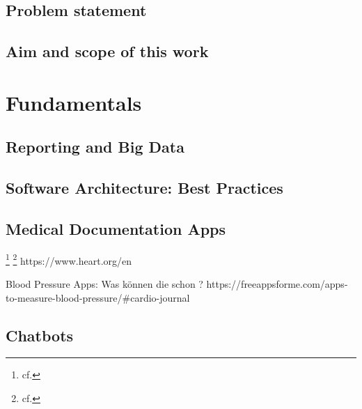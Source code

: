 \section{Problem statement}

\section{Aim and scope of this work}

\chapter{Fundamentals}\label{fundamentals}

\section{Reporting and Big Data}
\section{Software Architecture: Best Practices}
\section{Medical Documentation Apps}

\footnote{cf.\autocite{lupton_mhealth}}
\footnote{cf.\autocite{lupton_apps}}
https://www.heart.org/en

Blood Pressure Apps:
Was können die schon ? 
https://freeappsforme.com/apps-to-measure-blood-pressure/#cardio-journal
\section{Chatbots} 




